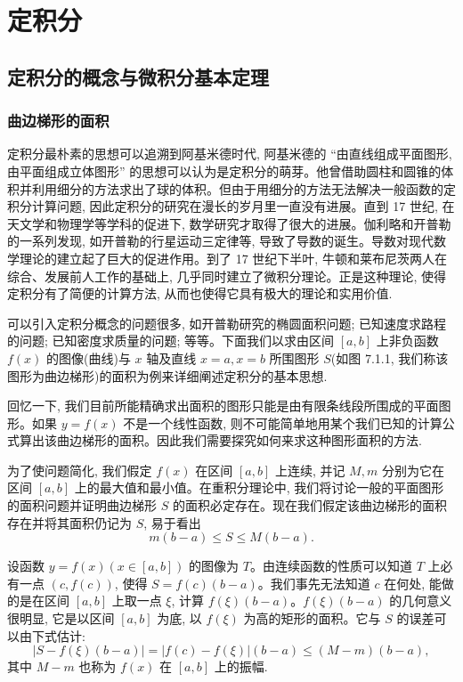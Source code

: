 \setcounter{chapter}{6} %
\chapter{定积分}
\label{chap:ma-7}

\section{定积分的概念与微积分基本定理}
\label{sec:ma-7-1}

\subsection{曲边梯形的面积}
\label{subsec:ma-7-1-1}

定积分最朴素的思想可以追溯到阿基米德时代, 阿基米德的 ``由直线组成平面图形, 由平面组成立体图形'' 的思想可以认为是定积分的萌芽。他曾借助圆柱和圆锥的体积并利用细分的方法求出了球的体积。但由于用细分的方法无法解决一般函数的定积分计算问题, 因此定积分的研究在漫长的岁月里一直没有进展。直到 17 世纪, 在天文学和物理学等学科的促进下, 数学研究才取得了很大的进展。伽利略和开普勒的一系列发现, 如开普勒的行星运动三定律等, 导致了导数的诞生。导数对现代数学理论的建立起了巨大的促进作用。到了 17 世纪下半叶, 牛顿和莱布尼茨两人在综合、发展前人工作的基础上, 几乎同时建立了微积分理论。正是这种理论, 使得定积分有了简便的计算方法, 从而也使得它具有极大的理论和实用价值.

可以引入定积分概念的问题很多, 如开普勒研究的椭圆面积问题; 已知速度求路程的问题; 已知密度求质量的问题; 等等。下面我们以求由区间 $[a,b]$ 上非负函数 $f(x)$ 的图像(曲线)与 $x$ 轴及直线 $x=a,x=b$ 所围图形 $S$(如图 7.1.1, 我们称该图形为曲边梯形)的面积为例来详细阐述定积分的基本思想.

回忆一下, 我们目前所能精确求出面积的图形只能是由有限条线段所围成的平面图形。如果 $y=f(x)$ 不是一个线性函数, 则不可能简单地用某个我们已知的计算公式算出该曲边梯形的面积。因此我们需要探究如何来求这种图形面积的方法.

为了使问题简化, 我们假定 $f(x)$ 在区间 $[a,b]$ 上连续, 并记 $M,m$ 分别为它在区间 $[a,b]$ 上的最大值和最小值。在重积分理论中, 我们将讨论一般的平面图形的面积问题并证明曲边梯形 $S$ 的面积必定存在。现在我们假定该曲边梯形的面积存在并将其面积仍记为 $S$, 易于看出
\[
  m(b-a)\leq S\leq M(b-a).
\]

设函数 $y=f(x)(x\in[a,b])$ 的图像为 $T$。由连续函数的性质可以知道 $T$ 上必有一点 $(c,f(c))$, 使得 $S=f(c)(b-a)$。我们事先无法知道 $c$ 在何处, 能做的是在区间 $[a,b]$ 上取一点 $\xi$, 计算 $f(\xi)(b-a)$。$f(\xi)(b-a)$ 的几何意义很明显, 它是以区间 $[a,b]$ 为底, 以 $f(\xi)$ 为高的矩形的面积。它与 $S$ 的误差可以由下式估计:
\[
  |S-f(\xi)(b-a)|=|f(c)-f(\xi)|(b-a)\leq (M-m)(b-a),
\]
其中 $M-m$ 也称为 $f(x)$ 在 $[a,b]$ 上的振幅.

